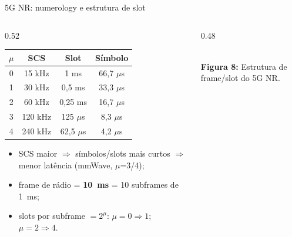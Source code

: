 \documentclass[aspectratio=169,11pt]{beamer}
\begin{document}
\begin{frame}{5G NR: numerology e estrutura de slot}
  \begin{columns}
    \begin{column}{0.52\textwidth}
      \scriptsize
      \begin{tabular}{@{}cccc@{}}
        \toprule
        $\mu$ & \textbf{SCS} & \textbf{Slot} & \textbf{Símbolo}\\
        \midrule
        0 & 15 kHz & 1 ms & 66,7 $\mu$s\\
        1 & 30 kHz & 0,5 ms & 33,3 $\mu$s\\
        2 & 60 kHz & 0,25 ms & 16,7 $\mu$s\\
        3 & 120 kHz & 125 $\mu$s & 8,3 $\mu$s\\
        4 & 240 kHz & 62,5 $\mu$s & 4,2 $\mu$s\\
        \bottomrule
      \end{tabular}
      \begin{itemize}
        \item SCS maior $\Rightarrow$ símbolos/slots mais curtos $\Rightarrow$ menor latência (mmWave, $\mu$=3/4);
        \item frame de rádio = \textbf{10~ms} = 10 subframes de 1~ms;
        \item slots por subframe $=2^{\mu}$: $\mu=0\Rightarrow 1$; $\mu=2\Rightarrow 4$.
      \end{itemize}
    \end{column}
    \begin{column}{0.48\textwidth}
      \begin{center}
        \\[1mm]
        {\scriptsize \textbf{Figura 8:} Estrutura de frame/slot do 5G NR.}
      \end{center}
    \end{column}
  \end{columns}
\end{frame}
\end{document}
